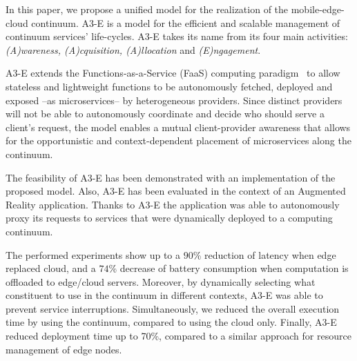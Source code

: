 In this paper, we propose a unified model for the realization of the mobile-edge-cloud continuum. A3-E is a model for the efficient and scalable management of continuum services' life-cycles. A3-E takes its name from its four main activities: \textit{(A)wareness, (A)cquisition, (A)llocation} and \textit{(E)ngagement}. 

A3-E extends the Functions-as-a-Service (FaaS) computing paradigm~\cite{Hendrickson:2016,baldini2017serverless,GarrigaMendonca2017} to allow stateless and lightweight functions to be autonomously fetched, deployed and exposed --as microservices-- by heterogeneous providers. Since distinct providers will not be able to autonomously coordinate and decide who should serve a client's request, the model enables a mutual client-provider awareness that allows for the opportunistic and context-dependent placement of microservices along the continuum. 

The feasibility of A3-E has been demonstrated with an implementation of the proposed model. Also, A3-E has been evaluated in the context of an Augmented Reality application. Thanks to A3-E the application was able to autonomously proxy its requests to services that were dynamically deployed to a computing continuum. 


The performed experiments show up to a $90$\% reduction of latency when edge replaced cloud, and a $74$\% decrease of battery consumption when computation is offloaded 
to edge/cloud servers. Moreover, by dynamically selecting what constituent to use in the continuum in different contexts, 
A3-E was able to prevent service interruptions. Simultaneously, we reduced the overall execution time by using the continuum, compared to using the cloud only. Finally, A3-E reduced deployment time up to 70\%, compared to a similar approach for resource management of edge nodes.






